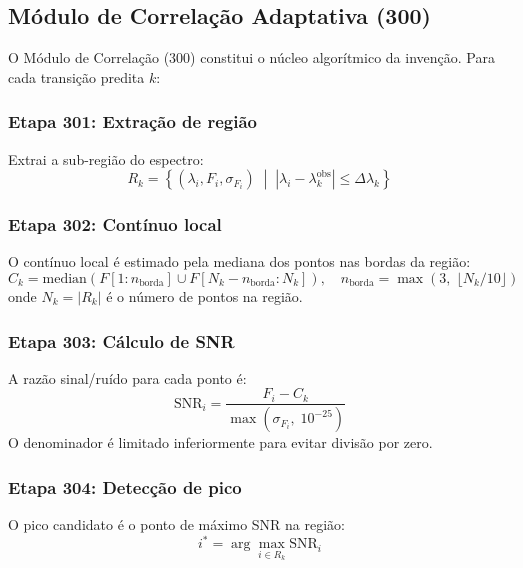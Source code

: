 \documentclass[12pt,a4paper]{article}
\begin{document}
\subsection{Módulo de Correlação Adaptativa (300)}

O Módulo de Correlação (300) constitui o núcleo algorítmico da
invenção. Para cada transição predita $k$:

\subsubsection{Etapa 301: Extração de região}

Extrai a sub-região do espectro:
\begin{equation}
R_k = \left\{(\lambda_i, F_i, \sigma_{F_i}) \;\middle|\;
  |\lambda_i - \lambda_k^{\text{obs}}| \leq \Delta\lambda_k
\right\}
\label{eq:regiao}
\end{equation}

\subsubsection{Etapa 302: Contínuo local}

O contínuo local é estimado pela mediana dos pontos nas bordas
da região:
\begin{equation}
C_k = \text{median}\left(
  F[1:n_{\text{borda}}] \cup F[N_k - n_{\text{borda}}:N_k]
\right), \quad
n_{\text{borda}} = \max\left(3,\; \lfloor N_k / 10 \rfloor\right)
\label{eq:continuo_local}
\end{equation}
onde $N_k = |R_k|$ é o número de pontos na região.

\subsubsection{Etapa 303: Cálculo de SNR}

A razão sinal/ruído para cada ponto é:
\begin{equation}
\text{SNR}_i = \frac{F_i - C_k}{\max(\sigma_{F_i},\; 10^{-25})}
\label{eq:snr}
\end{equation}
O denominador é limitado inferiormente para evitar divisão por zero.

\subsubsection{Etapa 304: Detecção de pico}

O pico candidato é o ponto de máximo SNR na região:
\begin{equation}
i^* = \arg\max_{i \in R_k} \text{SNR}_i
\label{eq:pico}
\end{equation}
\end{document}
